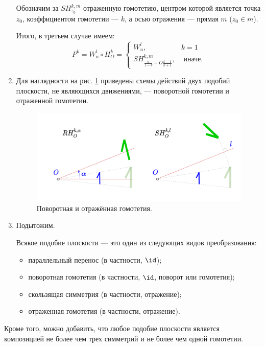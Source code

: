 \begin{enumerate}
Обозначим за $SH_{z_0}^{k,m}$ отраженную гомотетию, центром которой является точка $z_0$, коэффициентом гомотетии --- $k$, а осью отражения --- прямая $m$ ($z_0\in m$).

Итого, в третьем случае имеем:
$$
P^k=W_u^l\circ H_O^k=
\begin{cases}
W_u^l, & k=1 \\
SH_{\frac{u}{1-k}+O\frac{k-1}{k+1}}^{k,m}, & \mbox{ иначе}.
\end{cases}
$$

\item Для наглядности на рис. \ref{Central} приведены схемы действий двух подобий плоскости, не являющихся движениями, --- поворотной гомотетии и отраженной гомотетии.

\begin{figure}[hbt!]
\begin{center}
\includegraphics[scale=0.25]{RotSimHomot.png}
\end{center}\caption{Поворотная и отражённая гомотетия.}\label{Central}
\end{figure}


\item Подытожим.
\begin{thrm} Всякое подобие плоскости --- это один из следующих видов преобразования:
\begin{itemize}
\item параллельный перенос (в частности, $\id$);
\item поворотная гомотетия (в частности, $\id$, поворот или гомотетия);
\item скользящая симметрия (в частности, отражение);
\item отраженная гомотетия (в частности, отражение).
\end{itemize}
\end{thrm}
\end{enumerate}

Кроме того, можно добавить, что любое подобие плоскости является композицией не более чем трех симметрий и не более чем одной гомотетии.

